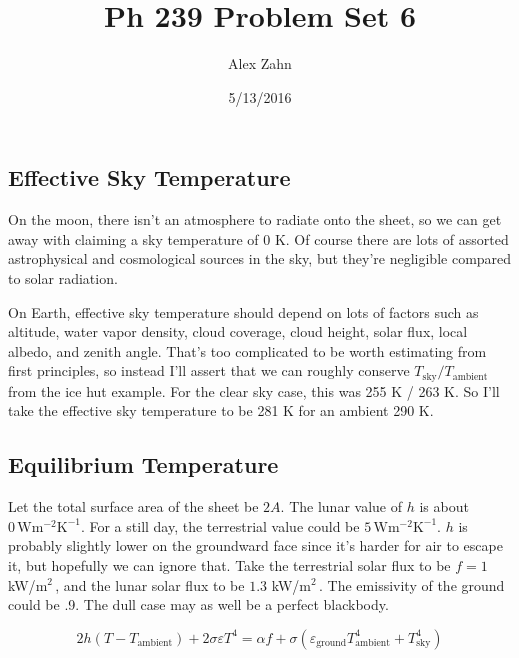 \documentclass[12pt]{article}
\title{Ph 239 Problem Set 6}
\author{Alex Zahn}
\date{5/13/2016}
\begin{document}
\maketitle

\newcommand{\wmsq}{W/\(\mathrm{m}^2\,\)}
\newcommand{\msq}{\(\mathrm{m}^2\,\)}
\newcommand{\micron}{\(\mu\mathrm{m}\)\,}
\newcommand{\mcb}{\(\mathrm{m}^3\,\)}


\section{}

\subsection{Effective Sky Temperature}

On the moon, there isn't an atmosphere to radiate onto the sheet, so we can get away with claiming a sky temperature of 0 K. Of course there are lots of assorted astrophysical and cosmological sources in the sky, but they're negligible compared to solar radiation.

On Earth, effective sky temperature should depend on lots of factors such as altitude, water vapor density, cloud coverage, cloud height, solar flux, local albedo, and zenith angle. That's too complicated to be worth estimating from first principles, so instead I'll assert that we can roughly conserve \(T_{\mathrm{sky}}/T_{\mathrm{ambient}}\) from the ice hut example. For the clear sky case, this was 255 K / 263 K. So I'll take the effective sky temperature to be 281 K for an ambient 290 K.

\subsection{Equilibrium Temperature}

Let the total surface area of the sheet be \(2A\). The lunar value of \(h\) is about \(0 \,\mathrm{W}\mathrm{m}^{-2}\mathrm{K}^{-1}\). For a still day, the terrestrial value could be \(5 \,\mathrm{W}\mathrm{m}^{-2}\mathrm{K}^{-1}\). \(h\) is probably slightly lower on the groundward face since it's harder for air to escape it, but hopefully we can ignore that. Take the terrestrial solar flux to be \(f = 1\) k\wmsq, and the lunar solar flux to be \(1.3\) k\wmsq. The emissivity of the ground could be .9. The dull case may as well be a perfect blackbody.

\[ 2h(T-T_{\mathrm{ambient}}) + 2\sigma\varepsilon T^4 = \alpha f + \sigma(\varepsilon_{\mathrm{ground}} T_{\mathrm{ambient}}^4+T_{\mathrm{sky}}^4)
\]
\end{document}
